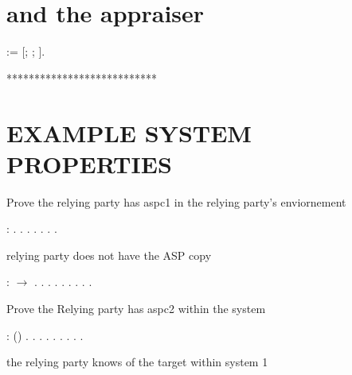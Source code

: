 \documentclass[12pt]{report}
\begin{document}
\section{and the appraiser}


 
\begin{coqdoccode}
\coqdocemptyline
\coqdocnoindent
{}  := [; ; ].\coqdoceol
\coqdocemptyline
\end{coqdoccode}
***************************
\section{EXAMPLE SYSTEM PROPERTIES}


  

 Prove the relying party has aspc1 in the relying party's enviornement 
\begin{coqdoccode}
\coqdocemptyline
\coqdocnoindent
{} :    .\coqdoceol
\coqdocnoindent
{}.  . . . . .\coqdoceol
\coqdocemptyline
\end{coqdoccode}
relying party does not have the ASP copy
 
\begin{coqdoccode}
\coqdocemptyline
\coqdocnoindent
{} :     \ensuremath{\rightarrow} .\coqdoceol
\coqdocnoindent
{}.  . . .  .  . . .\coqdoceol
\coqdocemptyline
\end{coqdoccode}
Prove the Relying party has aspc2 within the system
 
\begin{coqdoccode}
\coqdocemptyline
\coqdocnoindent
{} :   () .\coqdoceol
\coqdocnoindent
{}.  .  . . . . . .\coqdoceol
\coqdocemptyline
\end{coqdoccode}
the relying party knows of the target within system 1
 
\end{document}
